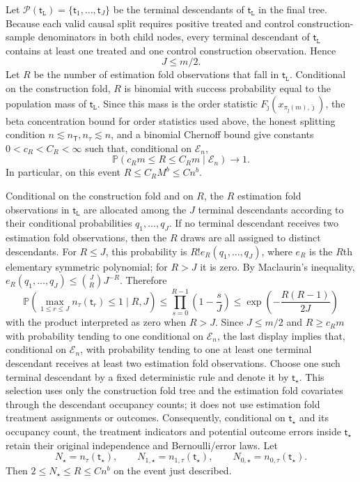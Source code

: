 \documentclass[10pt]{article}
\def\treeT{\mathsf{T}}
\def\nodet{\mathsf{t}}
\def\P{\mathbb{P}}
\theoremstyle{definition}
\theoremstyle{remark}
\begin{document}
Let $\mathcal P(\nodet_{\mathtt L})=\{\nodet_1,\ldots,\nodet_J\}$ be the terminal descendants of $\nodet_{\mathtt L}$ in the final tree. Because each valid causal split requires positive treated and control construction-sample denominators in both child nodes, every terminal descendant of $\nodet_{\mathtt L}$ contains at least one treated and one control construction observation. Hence
\[
    J\leq m/2.
\]
Let $R$ be the number of estimation fold observations that fall in $\nodet_{\mathtt L}$. Conditional on the construction fold, $R$ is binomial with success probability equal to the population mass of $\nodet_{\mathtt L}$. Since this mass is the order statistic $F_{\hat{\jmath}}(x_{\pi_{\hat{\jmath}}(m),\hat{\jmath}})$, the beta concentration bound for order statistics used above, the honest splitting condition $n\lesssim n_{\treeT},n_{\tau}\lesssim n$, and a binomial Chernoff bound give constants $0<c_R<C_R<\infty$ such that, conditional on $\mathcal E_n$,
\[
    \P(c_R m\leq R\leq C_R m\mid \mathcal E_n)\to1.
\]
In particular, on this event $R\leq C_R M^b\leq C n^b$.

Conditional on the construction fold and on $R$, the $R$ estimation fold observations in $\nodet_{\mathtt L}$ are allocated among the $J$ terminal descendants according to their conditional probabilities $q_1,\ldots,q_J$. If no terminal descendant receives two estimation fold observations, then the $R$ draws are all assigned to distinct descendants. For $R\leq J$, this probability is $R!e_R(q_1,\ldots,q_J)$, where $e_R$ is the $R$th elementary symmetric polynomial; for $R>J$ it is zero. By Maclaurin's inequality, $e_R(q_1,\ldots,q_J)\leq \binom{J}{R}J^{-R}$. Therefore
\[
    \P\!\left(\max_{1\leq r\leq J} n_{\tau}(\nodet_r)\leq1\mid R,J\right)
    \leq
    \prod_{s=0}^{R-1}\left(1-\frac{s}{J}\right)
    \leq \exp\!\left(-\frac{R(R-1)}{2J}\right)
\]
with the product interpreted as zero when $R>J$. Since $J\leq m/2$ and $R\geq c_Rm$ with probability tending to one conditional on $\mathcal E_n$, the last display implies that, conditional on $\mathcal E_n$, with probability tending to one at least one terminal descendant receives at least two estimation fold observations. Choose one such terminal descendant by a fixed deterministic rule and denote it by $\nodet_\star$. This selection uses only the construction fold tree and the estimation fold covariates through the descendant occupancy counts; it does not use estimation fold treatment assignments or outcomes. Consequently, conditional on $\nodet_\star$ and its occupancy count, the treatment indicators and potential outcome errors inside $\nodet_\star$ retain their original independence and Bernoulli/error laws. Let
\[
    N_\star=n_{\tau}(\nodet_\star),\qquad
    N_{1,\star}=n_{1,\tau}(\nodet_\star),\qquad
    N_{0,\star}=n_{0,\tau}(\nodet_\star).
\]
Then $2\leq N_\star\leq R\leq C n^b$ on the event just described.
\end{document}
